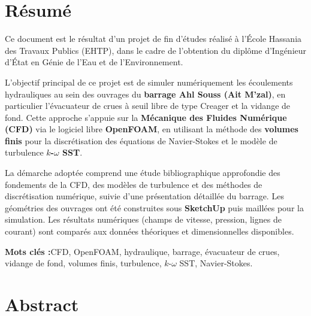 \chapter*{Résumé}
\thispagestyle{plain}

Ce document est le résultat d'un projet de fin d'études réalisé à l'École Hassania des Travaux Publics (EHTP), dans le cadre de l'obtention du diplôme d'Ingénieur d'État en Génie de l'Eau et de l'Environnement.

L'objectif principal de ce projet est de simuler numériquement les écoulements hydrauliques au sein des ouvrages du \textbf{barrage Ahl Souss (Ait M'zal)}, en particulier l'évacuateur de crues à seuil libre de type Creager et la vidange de fond. Cette approche s'appuie sur la \textbf{Mécanique des Fluides Numérique (CFD)} via le logiciel libre \textbf{OpenFOAM}, en utilisant la méthode des \textbf{volumes finis} pour la discrétisation des équations de Navier-Stokes et le modèle de turbulence \textbf{$k$-$\omega$ SST}.

La démarche adoptée comprend une étude bibliographique approfondie des fondements de la CFD, des modèles de turbulence et des méthodes de discrétisation numérique, suivie d'une présentation détaillée du barrage. Les géométries des ouvrages ont été construites sous \textbf{SketchUp} puis maillées pour la simulation. Les résultats numériques (champs de vitesse, pression, lignes de courant) sont comparés aux données théoriques et dimensionnelles disponibles.

\vspace{0.5cm}
\noindent\hrulefill

\noindent\textbf{Mots clés :}\quad CFD, OpenFOAM, hydraulique, barrage, évacuateur de crues, vidange de fond, volumes finis, turbulence, $k$-$\omega$ SST, Navier-Stokes.

\noindent\hrulefill
\vspace{0.3cm}

\newpage

\chapter*{Abstract}
\thispagestyle{plain}

